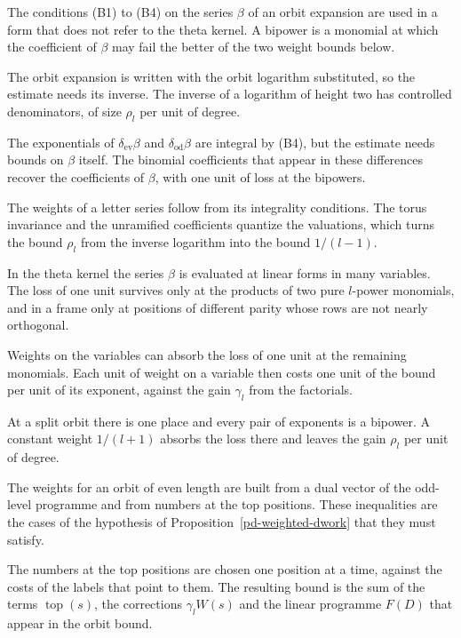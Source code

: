 The conditions (B1) to (B4) on the series $\beta$ of an orbit expansion are used in a form that
does not refer to the theta kernel. A bipower is a monomial at which the coefficient of $\beta$ may
fail the better of the two weight bounds below.

The orbit expansion is written with the orbit logarithm substituted, so the estimate needs its
inverse. The inverse of a logarithm of height two has controlled denominators, of size $\rho_l$ per
unit of degree.

The exponentials of $\delta_{\mathrm{ev}}\beta$ and $\delta_{\mathrm{od}}\beta$ are integral by
(B4), but the estimate needs bounds on $\beta$ itself. The binomial coefficients that appear in
these differences recover the coefficients of $\beta$, with one unit of loss at the bipowers.

The weights of a letter series follow from its integrality conditions. The torus invariance and the
unramified coefficients quantize the valuations, which turns the bound $\rho_l$ from the inverse
logarithm into the bound $1/(l-1)$.

In the theta kernel the series $\beta$ is evaluated at linear forms in many variables. The loss of
one unit survives only at the products of two pure $l$-power monomials, and in a frame only at
positions of different parity whose rows are not nearly orthogonal.

Weights on the variables can absorb the loss of one unit at the remaining monomials. Each unit of
weight on a variable then costs one unit of the bound per unit of its exponent, against the gain
$\gamma_l$ from the factorials.

At a split orbit there is one place and every pair of exponents is a bipower. A constant weight
$1/(l+1)$ absorbs the loss there and leaves the gain $\rho_l$ per unit of degree.

The weights for an orbit of even length are built from a dual vector of the odd-level programme and
from numbers at the top positions. These inequalities are the cases of the hypothesis of
Proposition~\ref{pd-weighted-dwork} that they must satisfy.

The numbers at the top positions are chosen one position at a time, against the costs of the labels
that point to them. The resulting bound is the sum of the terms $\operatorname{top}(s)$, the corrections
$\gamma_lW(s)$ and the linear programme $F(D)$ that appear in the orbit bound.

